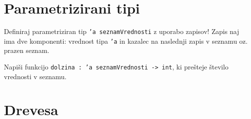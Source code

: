 \section{Parametrizirani tipi}

\begin{ex}
  Definiraj parametriziran tip \texttt{'a seznamVrednosti} z uporabo zapisov!
  Zapis naj ima dve komponenti: vrednost tipa \texttt{'a} in kazalec na
  naslednji zapis v seznamu oz. prazen seznam.

  Napi\v si funkcijo \texttt{dolzina : 'a seznamVrednosti -> int}, ki
  pre\v steje \v stevilo vrednosti v seznamu.


\end{ex} 

\section{Drevesa}


